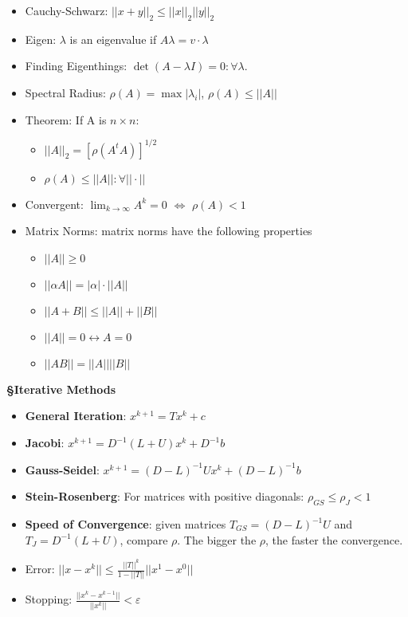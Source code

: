 \documentclass{article}
\begin{document}
\begin{tcolorbox}[colframe=black,colback=white,boxrule=0.3pt,arc=1pt,
left=0pt,right=0pt,top=0pt,bottom=0pt]
\begin{minipage}[t]{0.49\textwidth}
\begin{itemize}
\item Cauchy-Schwarz: $||x+y||_2\leq||x||_2||y||_2$
\item Eigen: $\lambda$ is an eigenvalue if $A\lambda=v \cdot \lambda$
\item Finding Eigenthings: $\det (A-\lambda I)=0:\forall \lambda$.
\item Spectral Radius: $\rho(A)=\max|\lambda_i|$, $\rho(A)\leq||A||$
\item Theorem: If A is $n\times n$:
\begin{itemize}
    \item $||A||_2=[\rho(A^tA)]^{1/2}$
    \item $\rho(A) \le ||A||:\forall||\cdot||$
\end{itemize}
\item Convergent: $\lim_{k\to\infty}A^k=0$ $\Leftrightarrow$ $\rho(A)<1$
\item Matrix Norms: matrix norms have the following properties
  \begin{minipage}[t]{0.45\textwidth}
\begin{itemize}
    \item $||A||\geq 0$
    \item $||\alpha A || = |\alpha|\cdot ||A||$
    \item $||A+B|| \leq ||A|| + ||B||$
\end{itemize}
  \end{minipage}
\hfill
  \begin{minipage}[t]{0.45\textwidth}
\begin{itemize}
  \item $||A||=0 \leftrightarrow A=0$
  \item $||AB||=||A||||B||$
\end{itemize}
  \end{minipage}
\end{itemize}

\textbf{\S Iterative Methods}
\begin{itemize}
\item \textbf{General Iteration}: $x^{k+1}=Tx^k+c$
\item \textbf{Jacobi}: $x^{k+1}=D^{-1}(L+U)x^k+D^{-1}b$
\item \textbf{Gauss-Seidel}: $x^{k+1}=(D-L)^{-1}Ux^k+(D-L)^{-1}b$
\item \textbf{Stein-Rosenberg}: For matrices with positive diagonals: $\rho_{GS}\leq\rho_J<1$
\item \textbf{Speed of Convergence}: given matrices $T_{GS}=(D-L)^{-1}U$ and $T_J =D^{-1}(L+U)$, compare $\rho$. The bigger the $\rho$, the faster the convergence.
\item Error: $||x-x^k||\leq\frac{||T||^k}{1-||T||}||x^1-x^0||$
\item Stopping: $\frac{||x^k-x^{k-1}||}{||x^k||}<\varepsilon$
\end{itemize}


\end{minipage}
\end{tcolorbox}
\end{document}

